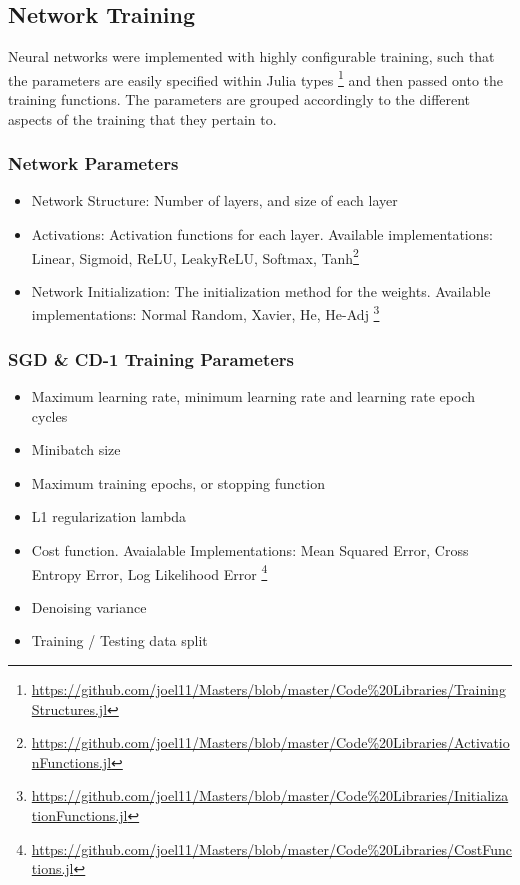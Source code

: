 \documentclass[a4paper,11pt,oneside]{article}
\theoremstyle{plain}
\theoremstyle{definition}
\begin{document}
\subsection{Network Training}

Neural networks were implemented with highly configurable training, such that the parameters are easily specified within Julia types \footnote{\url{https://github.com/joel11/Masters/blob/master/Code\%20Libraries/TrainingStructures.jl}} and then passed onto the training functions. The parameters are grouped accordingly to the different aspects of the training that they pertain to.

\subsubsection{Network Parameters}
\begin{itemize}
	\item[1] Network Structure: Number of layers, and size of each layer
	\item[2] Activations: Activation functions for each layer. Available implementations: Linear, Sigmoid, ReLU, LeakyReLU, Softmax, Tanh\footnote{\url{https://github.com/joel11/Masters/blob/master/Code\%20Libraries/ActivationFunctions.jl}}
	\item[3] Network Initialization: The initialization method for the weights. Available implementations: Normal Random, Xavier, He, He-Adj \footnote{\url{https://github.com/joel11/Masters/blob/master/Code\%20Libraries/InitializationFunctions.jl}}
\end{itemize}

\subsubsection{SGD \& CD-1 Training Parameters}
\begin{itemize}
	\item[1] Maximum learning rate, minimum learning rate and learning rate epoch cycles
	\item[2] Minibatch size
	\item[3] Maximum training epochs, or stopping function
	\item[4] L1 regularization lambda
	\item[5] Cost function. Avaialable Implementations: Mean Squared Error, Cross Entropy Error, Log Likelihood Error \footnote{\url{https://github.com/joel11/Masters/blob/master/Code\%20Libraries/CostFunctions.jl}}
	\item[6] Denoising variance
	\item[7] Training / Testing data split
\end{itemize}	
\end{document}
